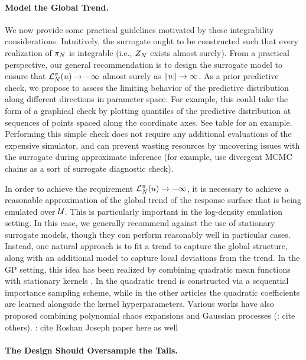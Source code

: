 \documentclass[12pt]{article}
\begin{document}
\paragraph{Model the Global Trend.}
We now provide some practical guidelines motivated by these integrability considerations.
Intuitively, the surrogate ought to be constructed such that every realization of $\postEm[\Ndesign]$
is integrable (i.e., $\normCstEm$ exists almost surely). From a practical perspective, our general 
recommendation is to design the surrogate model to ensure that $\lpostEm[\Ndesign](\Par) \to -\infty$
almost surely as $\norm{\Par} \to \infty$. As a prior predictive check, we propose to   
assess the limiting behavior of the predictive distribution along different directions in parameter
space. For example, this could take the form of a graphical check by plotting quantiles of 
the predictive distribution at sequences of points spaced along the coordinate axes. 
See table \todo for an example. Performing this simple check does not require any additional 
evaluations of the expensive simulator, and can prevent wasting resources by uncovering 
issues with the surrogate during approximate inference (for example, \citet{emPostDens}
use divergent MCMC chains as a sort of surrogate diagnostic check).

In order to achieve the requirement $\lpostEm[\Ndesign](\Par) \to -\infty$, it is 
necessary to achieve a reasonable approximation of the global trend of the response 
surface that is being emulated over $\parSpace$. This is particularly important in the
log-density emulation setting. In this case, we generally recommend against the use of 
stationary surrogate models, though they can perform reasonably well in particular cases.
Instead, one natural approach is to fit a trend to capture the global structure, along with an 
additional model to capture local deviations from the trend. In the GP setting, this idea has 
been realized by combining quadratic mean functions with stationary kernels 
\citep{emPostDens,SinsbeckNowak,VehtariParallelGP,llikEmABC,ABCGP,pseudoMarginalGP}. In 
\citet{emPostDens} the quadratic trend is constructed via a sequential importance sampling
scheme, while in the other articles the quadratic coefficients are learned alongside the 
kernel hyperparameters. Various works have also proposed combining polynomial chaos
expansions and Gaussian processes \citep{SinsbeckNowak} (\todo: cite others).
\todo: cite Roshan Joseph paper here as well

\paragraph{The Design Should Oversample the Tails.}
\end{document}
